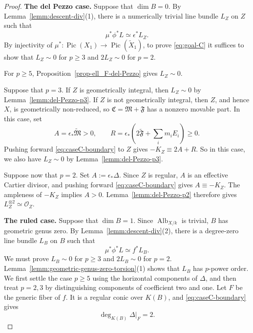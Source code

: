 \documentclass[10pt,abstract=true]{scrartcl}
\numberwithin{equation}{section}
\theoremstyle{definition}
\theoremstyle{remark}
\DeclareMathOperator\Alb{Alb}
\DeclareMathOperator\Pic{Pic}
\begin{document}
\begin{proof}
  \par\smallskip
  \noindent\textbf{The del Pezzo case.}
  Suppose that $\dim B=0$.
  By Lemma~\ref{lemm:descent-div}\textup{(1)}, there is a numerically trivial line bundle $L_Z$ on $Z$ such that
  \begin{equation}\label{eq:caseC-descent-Z}
    \mu^*\phi^*L\simeq\epsilon^*L_Z.
  \end{equation}
  By injectivity of $\mu^*\colon \Pic(X_1)\to \Pic(\widetilde X_1)$, to prove \eqref{eq:goal-C} it suffices to show that $L_Z\sim0$ for $p\geq3$ and $2L_Z\sim0$ for $p=2$.

  For $p\geq5$, Proposition~\ref{prop-ell_F-del-Pezzo} gives $L_Z\sim0$.

  Suppose that $p=3$.
  If $Z$ is geometrically integral, then $L_Z \sim 0$ by Lemma~\ref{lemm:del-Pezzo-p3}.
  If $Z$ is not geometrically integral, then $Z$, and hence $X$, is geometrically non-reduced, so $\mathfrak C=\mathfrak M+\mathfrak F$ has a nonzero movable part.
  In this case, set
  \[
    A=\epsilon_*\widetilde{\mathfrak M}>0,\qquad
    R=\epsilon_*\left(2\widetilde{\mathfrak F}+\sum_i m_iE_i\right)\geq0.
  \]
  Pushing forward \eqref{eq:caseC-boundary} to $Z$ gives $-K_Z\equiv2A+R$.
  So in this case, we also have $L_Z\sim0$ by Lemma~\ref{lemm:del-Pezzo-p3}.

  Suppose now that $p=2$.
  Set $A:=\epsilon_*\Delta$.
  Since $Z$ is regular, $A$ is an effective Cartier divisor, and pushing forward \eqref{eq:caseC-boundary} gives $A\equiv-K_Z$.
  The ampleness of $-K_Z$ implies $A>0$.
  Lemma~\ref{lemm:del-Pezzo-p2} therefore gives $L_Z^{\otimes2}\simeq\mathcal O_Z$.

  \par\smallskip
  \noindent\textbf{The ruled case.}
  Suppose that $\dim B=1$.
  Since $\Alb_{X/k}$ is trivial, $B$ has geometric genus zero.
  By Lemma~\ref{lemm:descent-div}\textup{(2)}, there is a degree-zero line bundle $L_B$ on $B$ such that
  \begin{equation}\label{eq:caseC-descent-B}
    \mu^*\phi^*L\simeq f^*L_B.
  \end{equation}
  We must prove $L_B\sim0$ for $p\geq3$ and $2L_B\sim0$ for $p=2$.
  Lemma~\ref{lemm:geometric-genus-zero-torsion}\textup{(1)} shows that $L_B$ has $p$-power order.
  We first settle the case $p\geq5$ using the horizontal components of $\Delta$, and then treat $p=2,3$ by distinguishing components of coefficient two and one.
  Let $F$ be the generic fiber of $f$.
  It is a regular conic over $K(B)$, and \eqref{eq:caseC-boundary} gives
  \[
    \deg_{K(B)}\Delta|_F=2.
  \]


\end{proof}
\end{document}
